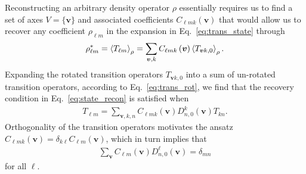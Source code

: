 \documentclass[notitlepage,twocolumn]{revtex4-2}
\newcommand{\p}[1]{\left(#1\right)} %
\newcommand{\bk}{\Braket} %
\renewcommand{\v}{\bm} %
\renewcommand{\set}[1]{\{#1\}} %
\newcommand{\1}{\mathds{1}}
\begin{document}
Reconstructing an arbitrary density operator $\rho$ essentially requires us to find a set of axes $V=\set{\v v}$ and associated coefficients $C_{\ell mk}\p{\v v}$ that would allow us to recover any coefficient $\rho_{\ell m}$ in the expansion in Eq.~\eqref{eq:trans_state} through
\begin{align}
  \rho_{\ell m}^* = \bk{T_{\ell m}}_\rho
  = \sum_{\v v,k} C_{\ell mk}\p{\v v} \bk{T_{\v vk,0}}_\rho.
  \label{eq:state_recon}
\end{align}
Expanding the rotated transition operators $T_{\v vk,0}$ into a sum of un-rotated transition operators, according to Eq.~\eqref{eq:trans_rot}, we find that the recovery condition in Eq.~\eqref{eq:state_recon} is satisfied when
\begin{align}
  T_{\ell m}
  = \sum_{\v v,k,n} C_{\ell mk}\p{\v v}
  D^k_{n,0}\p{\v v} T_{kn}.
\end{align}
Orthogonality of the transition operators motivates the ansatz $C_{\ell mk}\p{\v v}=\delta_{k\ell}C_{\ell m}\p{\v v}$, which in turn implies that
\begin{align}
  \sum_{\v v} C_{\ell m}\p{\v v} D^\ell_{n,0}\p{\v v} = \delta_{mn}
  \label{eq:tomo_recovery}
\end{align}
for all $\ell$.
\end{document}
